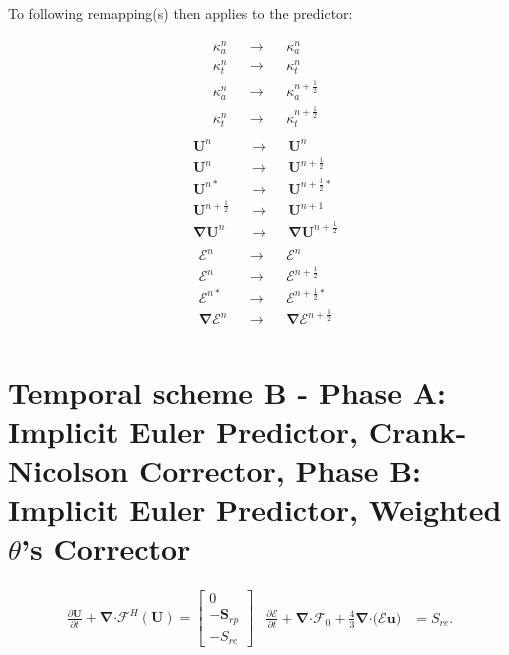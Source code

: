 \documentclass[10pt,letterpaper,notitlepage]{article}
\numberwithin{equation}{section}
\newcommand{\partialderiv}[2]{\frac{\partial #1}{\partial #2}}
\newcommand{\bnabla}{\boldsymbol{\nabla}}
\newcommand{\dotp}{\boldsymbol{\cdot}}
\newcommand{\RadE}{\mathcal{E}}
\newcommand{\RadF}{\boldsymbol{\mathcal{F}}}
\newcommand{\HydroF}{\mathcal{F}^H}
\newcommand{\HydroU}{\mathbf{U}}
\newcommand{\RadJ}{\RadF_0}
\newcommand{\half}{\frac{1}{2}}
\newcommand{\beq}{\begin{equation*} \begin{aligned}}
\newcommand{\eeq}{\end{aligned}\end{equation*}}
\newcommand{\beqn}{\begin{equation}\begin{aligned}}
\newcommand{\eeqn}{\end{aligned}\end{equation}}
\begin{document}
To following remapping(s) then applies to the predictor:
\begin{multicols}{2}
\beq 
&\kappa_a^n &&\to &&\kappa_a^n \\
&\kappa_t^n &&\to &&\kappa_t^n \\
&\kappa_a^{n} &&\to &&\kappa_a^{n+\half} \\
&\kappa_t^{n} &&\to &&\kappa_t^{n+\half} \\
\eeq
\beq 
&\HydroU^{n}        &&\to &&\HydroU^{n}        \\
&\HydroU^{n}        &&\to &&\HydroU^{n+\half}  \\
&\HydroU^{n*}       &&\to &&\HydroU^{n+\half*} \\
&\HydroU^{n+\half}  &&\to &&\HydroU^{n+1}      \\
&\bnabla \HydroU^{n}        &&\to &&\bnabla \HydroU^{n+\half}  \\
\eeq
\columnbreak
\beq 
&\RadE^{n}        &&\to &&\RadE^{n}        \\
&\RadE^{n}        &&\to &&\RadE^{n+\half}  \\
&\RadE^{n*}       &&\to &&\RadE^{n+\half*} \\
&\bnabla \RadE^{n}        &&\to &&\bnabla \RadE^{n+\half}  \\
\eeq
\end{multicols}
 



\newpage
\section{Temporal scheme B - Phase A: Implicit Euler Predictor, Crank-Nicolson Corrector, Phase B: Implicit Euler Predictor, Weighted $
\theta$'s Corrector}
\begin{subequations}
	\beqn 
	\partialderiv{\HydroU}{t} + \bnabla \dotp \HydroF(\HydroU) = 
	\begin{bmatrix}
		0 \\
		-\mathbf{S}_{rp} \\
		-S_{re} 
	\end{bmatrix}
	\eeqn 
	\beqn 
	\frac{\partial \RadE}{\partial t} 
	+\bnabla \dotp \RadJ  + \frac{4}{3} \bnabla \dotp \bigr( \RadE \mathbf{u}  \bigr)
	&=  S_{re}.
	\eeqn
\end{subequations}
\end{document}
